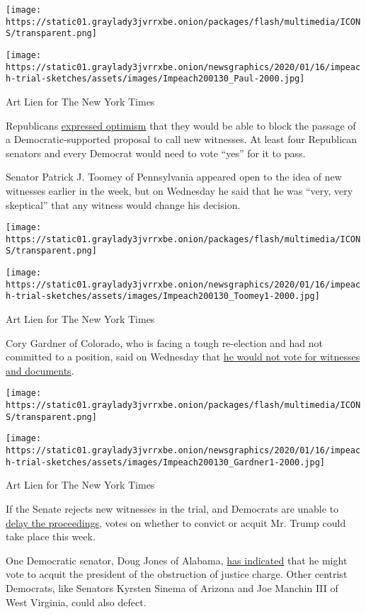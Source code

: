 \texttt{[image: https://static01.graylady3jvrrxbe.onion/packages/flash/multimedia/ICONS/transparent.png]}

\texttt{[image: https://static01.graylady3jvrrxbe.onion/newsgraphics/2020/01/16/impeach-trial-sketches/assets/images/Impeach200130\_Paul-2000.jpg]}

Art Lien for The New York Times

Republicans
\href{https://www.nytimes3xbfgragh.onion/live/2020/trump-impeachment-trial-01-30\#republicans-are-getting-where-we-need-to-be-on-the-witness-vote-senator-says}{expressed
optimism} that they would be able to block the passage of a
Democratic-supported proposal to call new witnesses. At least four
Republican senators and every Democrat would need to vote ``yes'' for it
to pass.

Senator Patrick J. Toomey of Pennsylvania appeared open to the idea of
new witnesses earlier in the week, but on Wednesday he said that he was
``very, very skeptical'' that any witness would change his decision.

\texttt{[image: https://static01.graylady3jvrrxbe.onion/packages/flash/multimedia/ICONS/transparent.png]}

\texttt{[image: https://static01.graylady3jvrrxbe.onion/newsgraphics/2020/01/16/impeach-trial-sketches/assets/images/Impeach200130\_Toomey1-2000.jpg]}

Art Lien for The New York Times

Cory Gardner of Colorado, who is facing a tough re-election and had not
committed to a position, said on Wednesday that
\href{https://www.nytimes3xbfgragh.onion/live/2020/impeachment-trial-live-01-29\#cory-gardner-witnesses-documents}{he
would not vote for witnesses and documents}.

\texttt{[image: https://static01.graylady3jvrrxbe.onion/packages/flash/multimedia/ICONS/transparent.png]}

\texttt{[image: https://static01.graylady3jvrrxbe.onion/newsgraphics/2020/01/16/impeach-trial-sketches/assets/images/Impeach200130\_Gardner1-2000.jpg]}

Art Lien for The New York Times

If the Senate rejects new witnesses in the trial, and Democrats are
unable to
\href{https://www.nytimes3xbfgragh.onion/live/2020/trump-impeachment-trial-01-30\#schumer-hints-at-a-tactic-to-delay-votes-to-acquit-trump}{delay
the proceedings}, votes on whether to convict or acquit Mr. Trump could
take place this week.

One Democratic senator, Doug Jones of Alabama,
\href{https://www.nytimes3xbfgragh.onion/live/2020/trump-impeachment-trial-01-30?action=click\&module=Top\%20Stories\&pgtype=Homepage\#trump-could-win-a-bipartisan-acquittal}{has
indicated} that he might vote to acquit the president of the obstruction
of justice charge. Other centrist Democrats, like Senators Kyrsten
Sinema of Arizona and Joe Manchin III of West Virginia, could also
defect.

